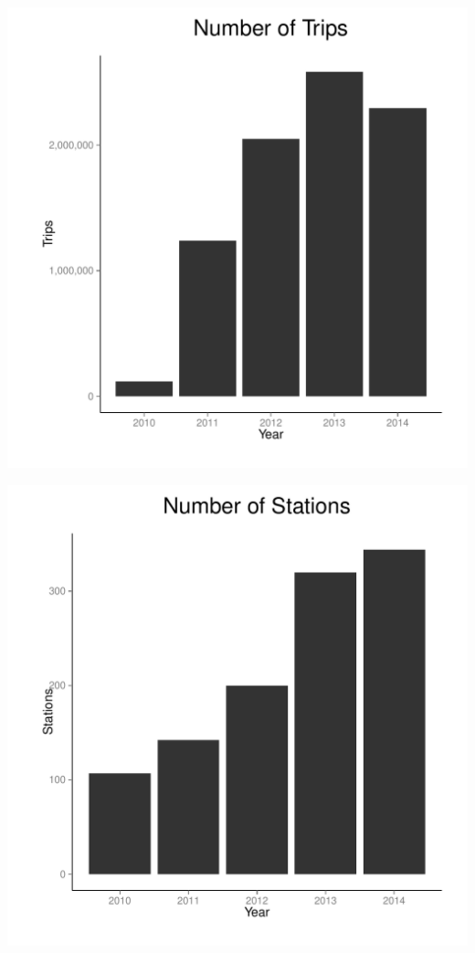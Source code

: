 \documentclass[12pt]{article}
\begin{document}
\begin{minipage}{.5\textwidth}
\includegraphics[scale=0.5]{../graphs/num_trips.pdf}
\end{minipage}%
\begin{minipage}{.5\textwidth}
\includegraphics[scale=0.5]{../graphs/num_stations.pdf}
\end{minipage}
\end{document}
